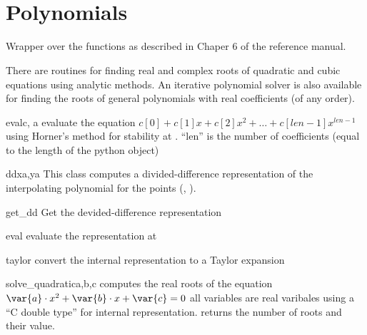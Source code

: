 \chapter[\protect\module{pygsl.poly} --- Polynomials]
{\protect{} \\ Polynomials}
\label{cha:poly-module}

Wrapper over the functions as described in Chaper 6 of the
\GSL reference manual.

There are routines for finding real  and complex roots of quadratic and cubic
equations  using analytic  methods. An  iterative polynomial  solver  is also
available for finding the roots of general polynomials with real coefficients
(of any order). 

\begin{funcdesc}{eval}{c, a}
  evaluate the equation
  $c[0] + c[1] x + c[2] x^2 + \dots + c[len-1] x^{len-1}$
  using Horner's method for stability at . ``len'' is the number of coefficients 
  (equal to the length of the python object)
\end{funcdesc}


\begin{classdesc}{dd}{xa,ya}
  This class computes a divided-difference representation of the
  interpolating polynomial for the points (, ). 

\begin{methoddesc}{get_dd}{}
  Get the devided-difference representation
\end{methoddesc}

\begin{methoddesc}{eval}{}
  evaluate the representation at 
\end{methoddesc}

\begin{methoddesc}{taylor}{}
  convert the internal representation to a Taylor expansion
\end{methoddesc}

\end{classdesc}


\begin{funcdesc}{solve\_quadratic}{a,b,c}
  computes the real roots of the equation
  $\var{a} \cdot x^2 + \var{b} \cdot x + \var{c} = 0$
  all variables are real varibales using a ``C double type'' for internal representation.
  returns the number of roots and their value.
\end{funcdesc}


